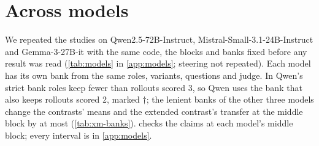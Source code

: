 \section{Across models}
\label{sec:models}

We repeated the studies on Qwen2.5-72B-Instruct, Mistral-Small-3.1-24B-Instruct and Gemma-3-27B-it with
the same code, the blocks and banks fixed before any result was read (\cref{tab:models} in
\cref{app:models}; steering not repeated). Each model has its own bank from the same roles, variants,
questions and judge. In Qwen's strict bank  roles keep fewer than
 rollouts scored 3, so Qwen uses the bank that also keeps rollouts scored 2, marked
$\dagger$; the lenient banks of the other three models change the contrasts' means and the extended
contrast's transfer at the middle block by at most  (\cref{tab:xm-banks}). 
checks the claims at each model's middle block; every interval is in \cref{app:models}.

\begin{table}[t]
\centering
\footnotesize
\caption{The claims at each model's middle block: a paired difference, or an AUROC with the value it must
clear (or, for the persona row, stay below) in brackets. \checkmark{} holds, $\times$ does not, $\circ$ no
clear difference (the interval includes zero, or the values are within 0.01). $^\dagger$Qwen's lenient bank.
$^a$Qwen's identical reply, rebuilt from the raw files. $^b$Gemma's opening sentence, rebuilt,
 lies. On Gender-Secret the margin is a few hundredths and the classes also differ
in topic.}
\label{tab:claims}
\resizebox{\linewidth}{!}{}
\end{table}

